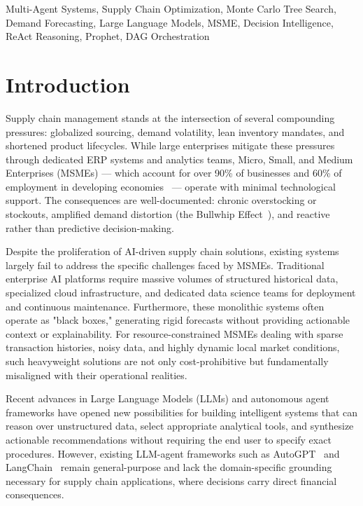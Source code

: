 \documentclass[conference]{IEEEtran}
\begin{document}
\begin{IEEEkeywords}
Multi-Agent Systems, Supply Chain Optimization, Monte Carlo Tree Search, Demand Forecasting, Large Language Models, MSME, Decision Intelligence, ReAct Reasoning, Prophet, DAG Orchestration
\end{IEEEkeywords}

\section{Introduction}

Supply chain management stands at the intersection of several compounding pressures: globalized sourcing, demand volatility, lean inventory mandates, and shortened product lifecycles. While large enterprises mitigate these pressures through dedicated ERP systems and analytics teams, Micro, Small, and Medium Enterprises (MSMEs) --- which account for over 90\% of businesses and 60\% of employment in developing economies~\cite{msme_report} --- operate with minimal technological support. The consequences are well-documented: chronic overstocking or stockouts, amplified demand distortion (the Bullwhip Effect~\cite{lee1997bullwhip}), and reactive rather than predictive decision-making.

Despite the proliferation of AI-driven supply chain solutions, existing systems largely fail to address the specific challenges faced by MSMEs. Traditional enterprise AI platforms require massive volumes of structured historical data, specialized cloud infrastructure, and dedicated data science teams for deployment and continuous maintenance. Furthermore, these monolithic systems often operate as "black boxes," generating rigid forecasts without providing actionable context or explainability. For resource-constrained MSMEs dealing with sparse transaction histories, noisy data, and highly dynamic local market conditions, such heavyweight solutions are not only cost-prohibitive but fundamentally misaligned with their operational realities.

Recent advances in Large Language Models (LLMs) and autonomous agent frameworks have opened new possibilities for building intelligent systems that can reason over unstructured data, select appropriate analytical tools, and synthesize actionable recommendations without requiring the end user to specify exact procedures. However, existing LLM-agent frameworks such as AutoGPT~\cite{autogpt2023} and LangChain~\cite{langchain2023} remain general-purpose and lack the domain-specific grounding necessary for supply chain applications, where decisions carry direct financial consequences.
\end{document}
